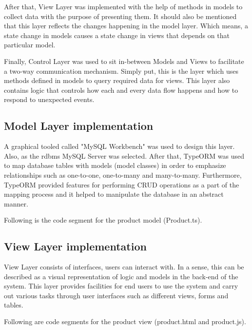 \documentclass[12pt]{report}
\begin{document}
After that, View Layer was implemented with the help of methods in models to collect data with the purpose of presenting them. It should also be mentioned that this layer reflects the changes happening in the model layer. Which means, a state change in models causes a state change in views that depends on that particular model.

Finally, Control Layer was used to sit in-between Models and Views to facilitate a two-way communication mechanism. Simply put, this is the layer which uses methods defined in models to query required data for views. This layer also contains logic that controls how each and every data flow happens and how to respond to unexpected events.

\subsection{Model Layer implementation}
A graphical tooled called "MySQL Workbench" was used to design this layer. Also, as the \acrshort{rdbms} MySQL Server was selected. After that, TypeORM was used to map database tables with models (model classes) in order to emphasize relationships such as one-to-one, one-to-many and many-to-many. Furthermore, TypeORM provided features for performing CRUD operations as a part of the mapping process and it helped to manipulate the database in an abstract manner.

\noindent
Following is the code segment for the product model (Product.ts).



\subsection{View Layer implementation}
View Layer consists of interfaces, users can interact with. In a sense, this can be described as a visual representation of logic and models in the back-end of the system. This layer provides facilities for end users to use the system and carry out various tasks through user interfaces such as different views, forms and tables.

\noindent
Following are code segments for the product view (product.html and product.js).



\newpage

\end{document}
